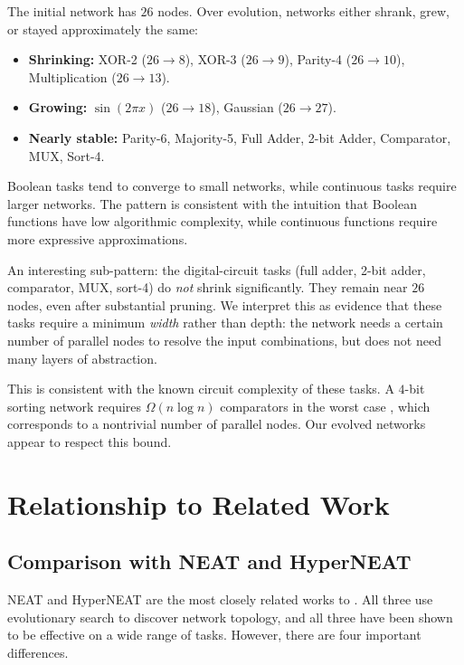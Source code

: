 The initial network has $26$ nodes. Over evolution, networks either
shrank, grew, or stayed approximately the same:

\begin{itemize}
  \item \textbf{Shrinking:} XOR-2 ($26 \to 8$), XOR-3 ($26 \to 9$),
    Parity-4 ($26 \to 10$), Multiplication ($26 \to 13$).
  \item \textbf{Growing:} $\sin(2\pi x)$ ($26 \to 18$), Gaussian
    ($26 \to 27$).
  \item \textbf{Nearly stable:} Parity-6, Majority-5, Full Adder,
    2-bit Adder, Comparator, MUX, Sort-4.
\end{itemize}

Boolean tasks tend to converge to small networks, while continuous
tasks require larger networks. The pattern is consistent with the
intuition that Boolean functions have low algorithmic complexity, while
continuous functions require more expressive approximations.

An interesting sub-pattern: the digital-circuit tasks (full adder,
2-bit adder, comparator, MUX, sort-4) do \emph{not} shrink
significantly. They remain near $26$ nodes, even after substantial
pruning. We interpret this as evidence that these tasks require a
minimum \emph{width} rather than depth: the network needs a certain
number of parallel nodes to resolve the input combinations, but does
not need many layers of abstraction.

This is consistent with the known circuit complexity of these tasks.
A $4$-bit sorting network requires $\Omega(n \log n)$ comparators in the
worst case \citep{knuth1998sorting}, which corresponds to a nontrivial
number of parallel nodes. Our evolved networks appear to respect this
bound.

\section{Relationship to Related Work}
\label{sec:disc-related}

\subsection{Comparison with NEAT and HyperNEAT}
\label{sec:disc-neat}

NEAT \citep{stanley2002evolving} and HyperNEAT
\citep{stanley2009hypercube} are the most closely related works to
\modnet{}. All three use evolutionary search to discover network
topology, and all three have been shown to be effective on a wide range
of tasks. However, there are four important differences.

